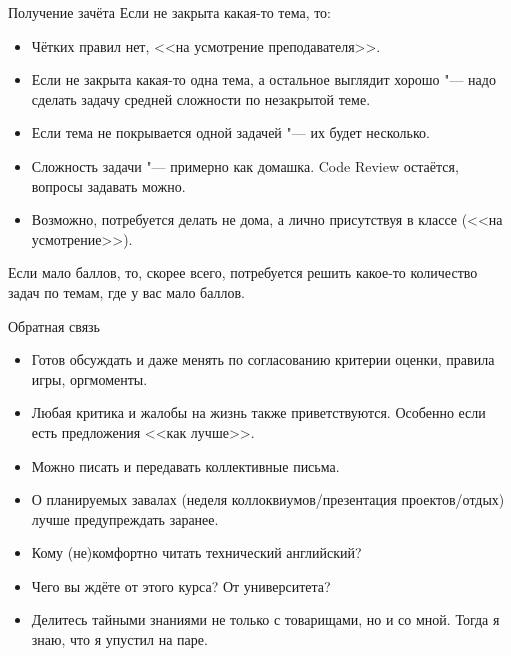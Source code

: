 \documentclass[utf8,xcolor=table]{beamer}
\begin{document}
\begin{frame}[t]{Получение зачёта}
	Если не закрыта какая-то тема, то:
	\begin{itemize}
		\item
			Чётких правил нет, <<на усмотрение преподавателя>>.
		\item
			Если не закрыта какая-то одна тема, а остальное выглядит хорошо "--- надо сделать задачу средней сложности по незакрытой теме.
		\item
			Если тема не покрывается одной задачей "--- их будет несколько.
		\item
			Сложность задачи "--- примерно как домашка. Code Review остаётся, вопросы задавать можно.
		\item
			Возможно, потребуется делать не дома, а лично присутствуя в классе (<<на усмотрение>>).
	\end{itemize}
	Если мало баллов, то, скорее всего, потребуется решить какое-то количество задач по темам, где у вас мало баллов.
\end{frame}

\begin{frame}[t]{Обратная связь}
	\begin{itemize}
		\item
			Готов обсуждать и даже менять по согласованию критерии оценки, правила игры, оргмоменты.
		\item
			Любая критика и жалобы на жизнь также приветствуются.
			Особенно если есть предложения <<как лучше>>.
		\item
			Можно писать и передавать коллективные письма.
		\item
			О планируемых завалах (неделя коллоквиумов/презентация проектов/отдых) лучше предупреждать заранее.
		\item
			Кому (не)комфортно читать технический английский?
		\item
			Чего вы ждёте от этого курса? От университета?
		\item
			Делитесь тайными знаниями не только с товарищами, но и со мной.
			Тогда я знаю, что я упустил на паре.
	\end{itemize}
\end{frame}
\end{document}
